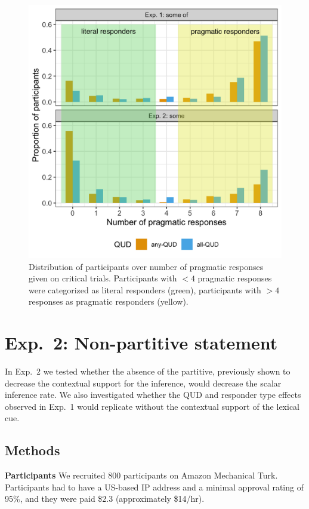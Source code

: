 \documentclass[10pt,letterpaper]{article}
\begin{document}
\begin{figure}
  \includegraphics[width=\linewidth]{plots/proportion.png}
  \caption{Distribution of participants over number of pragmatic responses given on critical trials. Participants with $< 4$ pragmatic responses were categorized as literal responders (green), participants with $> 4$ responses as pragmatic responders (yellow). }
  \label{fig:proportion}
\end{figure}

\section{Exp.~2: Non-partitive statement}

In Exp.~2 we tested whether the absence of the partitive, previously shown to decrease the contextual support for the inference, would decrease the scalar inference rate. We also investigated whether the QUD and responder type effects observed in Exp.~1 would replicate without the contextual support of the lexical cue.

\subsection{Methods}

\noindent \textbf{Participants} We recruited 800 participants on Amazon Mechanical Turk. Participants had to have a US-based IP address and a minimal approval rating of 95\%, and they were paid \$2.3 (approximately \$14/hr).
\end{document}
